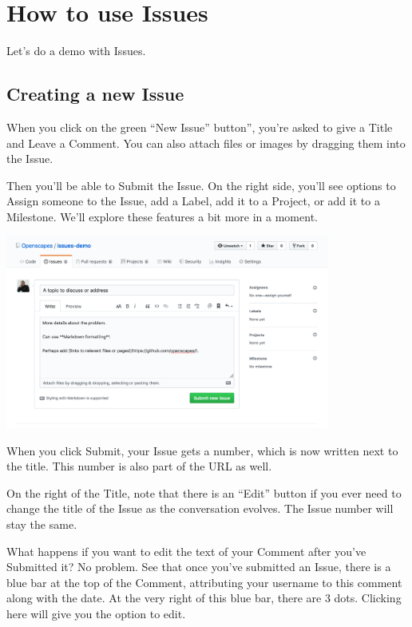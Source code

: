 \documentclass[
  letterpaper,
  DIV=11,
  numbers=noendperiod]{scrreprt}
\begin{document}
\hypertarget{how-to-use-issues}{%
\section{How to use Issues}\label{how-to-use-issues}}

Let's do a demo with Issues.

\hypertarget{creating-a-new-issue}{%
\subsection{Creating a new Issue}\label{creating-a-new-issue}}

When you click on the green ``New Issue'' button'', you're asked to give
a Title and Leave a Comment. You can also attach files or images by
dragging them into the Issue.

Then you'll be able to Submit the Issue. On the right side, you'll see
options to Assign someone to the Issue, add a Label, add it to a
Project, or add it to a Milestone. We'll explore these features a bit
more in a moment.

\includegraphics[width=0.8\textwidth,height=\textheight]{./img/issues-create.png}

When you click Submit, your Issue gets a number, which is now written
next to the title. This number is also part of the URL as well.

On the right of the Title, note that there is an ``Edit'' button if you
ever need to change the title of the Issue as the conversation evolves.
The Issue number will stay the same.

What happens if you want to edit the text of your Comment after you've
Submitted it? No problem. See that once you've submitted an Issue, there
is a blue bar at the top of the Comment, attributing your username to
this comment along with the date. At the very right of this blue bar,
there are 3 dots. Clicking here will give you the option to edit.
\end{document}

